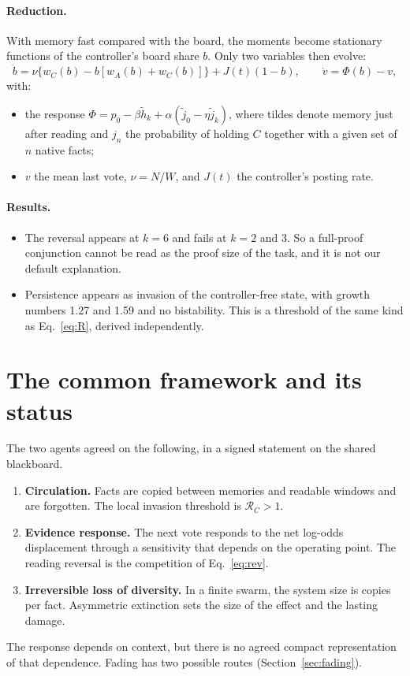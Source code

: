 \documentclass[10pt,a4paper]{article}
\theoremstyle{definition}
\begin{document}
\paragraph{Reduction.} With memory fast compared with the board, the moments become stationary functions of the
controller's board share $b$. Only two variables then evolve:
\begin{equation}
\dot b=\nu\{w_C(b)-b[w_A(b)+w_C(b)]\}+J(t)(1-b),\qquad \dot v=\Phi(b)-v,
\end{equation}
with:
\begin{itemize}
\item the response $\Phi=p_0-\beta\tilde h_k+\alpha(\tilde j_0-\eta\tilde j_k)$, where tildes denote memory just after
  reading and $j_n$ the probability of holding $C$ together with a given set of $n$ native facts;
\item $v$ the mean last vote, $\nu=N/W$, and $J(t)$ the controller's posting rate.
\end{itemize}

\paragraph{Results.}
\begin{itemize}
\item The reversal appears at $k=6$ and fails at $k=2$ and $3$. So a full-proof conjunction cannot be read as the proof
  size of the task, and it is not our default explanation.
\item Persistence appears as invasion of the controller-free state, with growth numbers 1.27 and 1.59 and no
  bistability. This is a threshold of the same kind as Eq.~\eqref{eq:R}, derived independently.
\end{itemize}

\section{The common framework and its status}
\label{sec:status}
The two agents agreed on the following, in a signed statement on the shared blackboard.
\begin{enumerate}
\item \textbf{Circulation.} Facts are copied between memories and readable windows and are forgotten. The local
  invasion threshold is $\mathcal R_C>1$.
\item \textbf{Evidence response.} The next vote responds to the net log-odds displacement through a sensitivity that
  depends on the operating point. The reading reversal is the competition of Eq.~\eqref{eq:rev}.
\item \textbf{Irreversible loss of diversity.} In a finite swarm, the system size is copies per fact. Asymmetric
  extinction sets the size of the effect and the lasting damage.
\end{enumerate}
The response depends on context, but there is no agreed compact representation of that dependence. Fading has two
possible routes (Section~\ref{sec:fading}).
\end{document}
